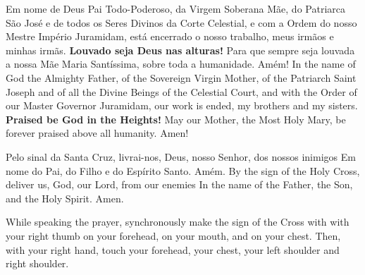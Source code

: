 {\begin{songs}{}
      \beginverse
        Em nome de Deus Pai Todo-Poderoso, da Virgem
        Soberana Mãe, do Patriarca São José e de todos
        os Seres Divinos da Corte Celestial, e com
        a Ordem do nosso Mestre Império Juramidam,
        está encerrado o nosso trabalho, meus irmãos
        e minhas irmãs.
        \textbf{Louvado seja Deus nas alturas!}
        \parspace
        Para que sempre seja louvada a nossa Mãe Maria
        Santíssima, sobre toda a humanidade. Amém!
      \endverse
      \beginverse\color{englishcolor}
        In the name of God the Almighty Father, of the Sovereign
        Virgin Mother, of the Patriarch Saint Joseph and of all
        the Divine Beings of the Celestial Court, and with
        the Order of our Master Governor Juramidam,
        our work is ended, my brothers and my sisters.
        \textbf{Praised be God in the Heights!}
        \parspace
        May our Mother, the Most Holy Mary, be forever
        praised above all humanity. Amen!
      \endverse
    \endsong


      \beginverse
        Pelo sinal da Santa Cruz,
        livrai-nos, Deus, nosso Senhor,
        dos nossos inimigos
        \parspace
        Em nome do Pai,
        do Filho e
        do Espírito Santo.
        \parspace
        Amém.
      \endverse
      \beginverse\color{englishcolor}
        By the sign of the Holy Cross,
        deliver us, God, our Lord,
        from our enemies
        \parspace
        In the name of the Father,
        the Son, and
        the Holy Spirit.
        \parspace
        Amen.
      \endverse
      \begin{note}
        While speaking the prayer, synchronously make
        the sign of the Cross with with your right thumb
        on your forehead,
        on your mouth, and
        on your chest.
        \parspace
        Then, with your right hand, touch
        your forehead,
        your chest,
        your left shoulder and right shoulder.
      \end{note}
    \endsong

  \end{songs}

}
